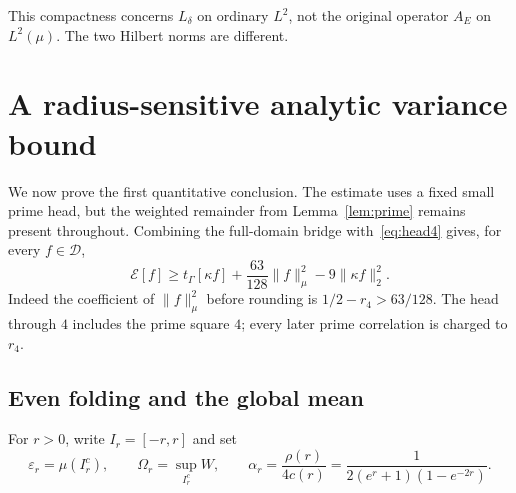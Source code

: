 \documentclass[11pt,a4paper]{article}
\numberwithin{equation}{section}
\theoremstyle{remark}
\newcommand{\E}{\mathcal E}
\newcommand{\D}{\mathcal D}
\newcommand{\tg}{t_{\Gamma}}
\newcommand{\norm}[1]{\lVert #1\rVert}
\begin{document}
This compactness concerns $L_\delta$ on ordinary $L^2$, not the original operator $A_E$ on $L^2(\mu)$. The two Hilbert norms are different.

\section{A radius-sensitive analytic variance bound}\label{sec:seed}

We now prove the first quantitative conclusion. The estimate uses a fixed small prime head, but the weighted remainder from Lemma~\ref{lem:prime} remains present throughout. Combining the full-domain bridge with~\eqref{eq:head4} gives, for every $f\in\D$,
\begin{equation}\label{eq:masscontrol}
 \E[f]\ge\tg[\kappa f]+\frac{63}{128}\norm f_\mu^2
                         -9\norm{\kappa f}_2^2.
\end{equation}
Indeed the coefficient of $\norm f_\mu^2$ before rounding is $1/2-r_4>63/128$. The head through $4$ includes the prime square $4$; every later prime correlation is charged to $r_4$.

\subsection{Even folding and the global mean}

For $r>0$, write $I_r=[-r,r]$ and set
\begin{equation}\label{eq:radiusdata}
 \varepsilon_r=\mu(I_r^c),\qquad
 \Omega_r=\sup_{I_r^c}W,\qquad
 \alpha_r=\frac{\rho(r)}{4c(r)}
 =\frac1{2(e^r+1)(1-e^{-2r})}.
\end{equation}
\end{document}
